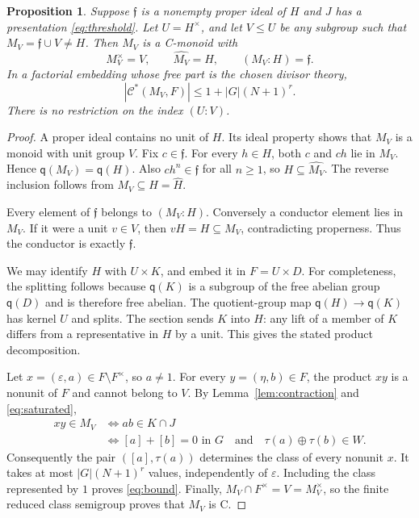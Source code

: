 \documentclass[11pt]{article}
\newtheorem{proposition}[theorem]{Proposition}
\theoremstyle{definition}
\newcommand{\q}{\mathsf q}
\newcommand{\C}{\mathcal C}
\newcommand{\ff}{\mathfrak f}
\begin{document}
\begin{proposition}\label{prop:construction}
Suppose $\ff$ is a nonempty proper ideal of $H$ and $J$ has a presentation \eqref{eq:threshold}. Let $U=H^\times$, and let $V\le U$ be any subgroup such that $M_V=\ff\cup V\ne H$. Then $M_V$ is a C-monoid with
\[
 M_V^\times=V,\qquad \widehat{M_V}=H,\qquad (M_V:H)=\ff.
\]
In a factorial embedding whose free part is the chosen divisor theory,
\begin{equation}\label{eq:bound}
 |\C^*(M_V,F)|\le 1+|G|(N+1)^r.
\end{equation}
There is no restriction on the index $(U:V)$.
\end{proposition}
\begin{proof}
A proper ideal contains no unit of $H$. Its ideal property shows that $M_V$ is a monoid with unit group $V$. Fix $c\in\ff$. For every $h\in H$, both $c$ and $ch$ lie in $M_V$. Hence $\q(M_V)=\q(H)$. Also $ch^n\in\ff$ for all $n\ge1$, so $H\subseteq\widehat{M_V}$. The reverse inclusion follows from $M_V\subseteq H=\widehat H$.

Every element of $\ff$ belongs to $(M_V:H)$. Conversely a conductor element lies in $M_V$. If it were a unit $v\in V$, then $vH=H\subseteq M_V$, contradicting properness. Thus the conductor is exactly $\ff$.

We may identify $H$ with $U\times K$, and embed it in $F=U\times D$. For completeness, the splitting follows because $\q(K)$ is a subgroup of the free abelian group $\q(D)$ and is therefore free abelian. The quotient-group map $\q(H)\to\q(K)$ has kernel $U$ and splits. The section sends $K$ into $H$: any lift of a member of $K$ differs from a representative in $H$ by a unit. This gives the stated product decomposition.

Let $x=(\varepsilon,a)\in F\setminus F^\times$, so $a\ne1$. For every $y=(\eta,b)\in F$, the product $xy$ is a nonunit of $F$ and cannot belong to $V$. By Lemma~\ref{lem:contraction} and \eqref{eq:saturated},
\begin{align*}
 xy\in M_V
 &\Longleftrightarrow ab\in K\cap J\\
 &\Longleftrightarrow [a]+[b]=0\text{ in }G
       \quad\text{and}\quad \tau(a)\oplus\tau(b)\in W.
\end{align*}
Consequently the pair $([a],\tau(a))$ determines the class of every nonunit $x$. It takes at most $|G|(N+1)^r$ values, independently of $\varepsilon$. Including the class represented by $1$ proves \eqref{eq:bound}. Finally, $M_V\cap F^\times=V=M_V^\times$, so the finite reduced class semigroup proves that $M_V$ is C.
\end{proof}
\end{document}
